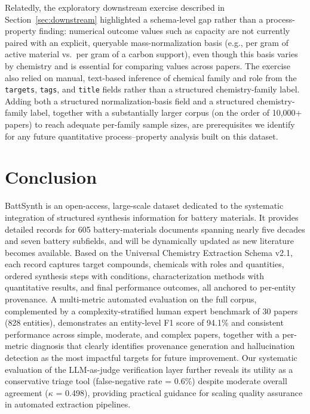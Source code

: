\documentclass[12pt,a4paper]{article}
\begin{document}
Relatedly, the exploratory downstream exercise described in Section~\ref{sec:downstream} highlighted a schema-level gap rather than a process-property finding: numerical outcome values such as capacity are not currently paired with an explicit, queryable mass-normalization basis (e.g., per gram of active material vs.\ per gram of a carbon support), even though this basis varies by chemistry and is essential for comparing values across papers. The exercise also relied on manual, text-based inference of chemical family and role from the \texttt{targets}, \texttt{tags}, and \texttt{title} fields rather than a structured chemistry-family label. Adding both a structured normalization-basis field and a structured chemistry-family label, together with a substantially larger corpus (on the order of 10,000+ papers) to reach adequate per-family sample sizes, are prerequisites we identify for any future quantitative process--property analysis built on this dataset.

\section{Conclusion}
\label{sec:conclusion}

BattSynth is an open-access, large-scale dataset dedicated to the systematic integration of structured synthesis information for battery materials. It provides detailed records for 605 battery-materials documents spanning nearly five decades and seven battery subfields, and will be dynamically updated as new literature becomes available. Based on the Universal Chemistry Extraction Schema v2.1, each record captures target compounds, chemicals with roles and quantities, ordered synthesis steps with conditions, characterization methods with quantitative results, and final performance outcomes, all anchored to per-entity provenance. A multi-metric automated evaluation on the full corpus, complemented by a complexity-stratified human expert benchmark of 30 papers (828 entities), demonstrates an entity-level F1 score of 94.1\% and consistent performance across simple, moderate, and complex papers, together with a per-metric diagnosis that clearly identifies provenance generation and hallucination detection as the most impactful targets for future improvement. Our systematic evaluation of the LLM-as-judge verification layer further reveals its utility as a conservative triage tool (false-negative rate = 0.6\%) despite moderate overall agreement ($\kappa$ = 0.498), providing practical guidance for scaling quality assurance in automated extraction pipelines.
\end{document}
